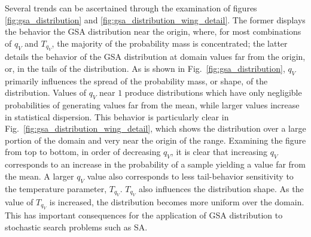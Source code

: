 \documentclass[11pt]{afthesis}
\begin{document}
	Several trends can be ascertained through the examination of figures \ref{fig:gsa_distribution} and \ref{fig:gsa_distribution_wing_detail}. The former displays the behavior the GSA distribution near the origin, where, for most combinations of $q_V$ and $T_{q_V}$, the majority of the probability mass is concentrated; the latter details the behavior of the GSA distribution at domain values far from the origin, or, in the tails of the distribution. As is shown in Fig.~\ref{fig:gsa_distribution}, $q_V$ primarily influences the spread of the probability mass, or shape, of the distribution. Values of $q_V$ near $1$ produce distributions which have only negligible probabilities of generating values far from the mean, while larger values increase in statistical dispersion. This behavior is particularly clear in Fig.~\ref{fig:gsa_distribution_wing_detail}, which shows the distribution over a large portion of the domain and very near the origin of the range. Examining the figure from top to bottom, in order of decreasing $q_V$, it is clear that increasing $q_V$ corresponds to an increase in the probability of a sample yielding a value far from the mean. A larger $q_V$ value also corresponds to less tail-behavior sensitivity to the temperature parameter, $T_{q_V}$. $T_{q_V}$ also influences the distribution shape. As the value of $T_{q_V}$ is increased, the distribution becomes more uniform over the domain. This has important consequences for the application of GSA distribution to stochastic search problems such as SA.
	
\end{document}
